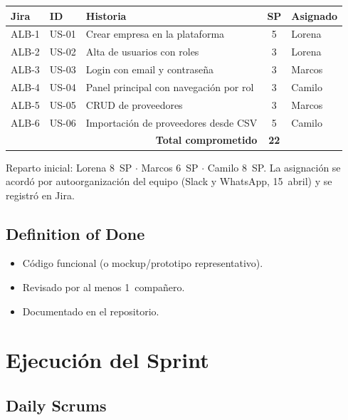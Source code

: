 \documentclass[11pt,a4paper]{article}
\begin{document}
\begin{center}
\begin{tabular}{lllcl}
\toprule
\textbf{Jira} & \textbf{ID} & \textbf{Historia} & \textbf{SP} & \textbf{Asignado} \\
\midrule
ALB-1 & US-01 & Crear empresa en la plataforma       & 5 & Lorena \\
ALB-2 & US-02 & Alta de usuarios con roles           & 3 & Lorena \\
ALB-3 & US-03 & Login con email y contraseña         & 3 & Marcos \\
ALB-4 & US-04 & Panel principal con navegación por rol & 3 & Camilo \\
ALB-5 & US-05 & CRUD de proveedores                  & 3 & Marcos \\
ALB-6 & US-06 & Importación de proveedores desde CSV & 5 & Camilo \\
\midrule
\multicolumn{3}{r}{\textbf{Total comprometido}} & \textbf{22} & \\
\bottomrule
\end{tabular}
\end{center}

Reparto inicial: Lorena 8~SP $\cdot$ Marcos 6~SP $\cdot$ Camilo 8~SP.
La asignación se acordó por autoorganización del equipo (Slack y WhatsApp,
15~abril) y se registró en Jira.

\subsection{Definition of Done}

\begin{itemize}
\item Código funcional (o mockup/prototipo representativo).
\item Revisado por al menos 1~compañero.
\item Documentado en el repositorio.
\end{itemize}

\section{Ejecución del Sprint}

\subsection{Daily Scrums}
\end{document}
